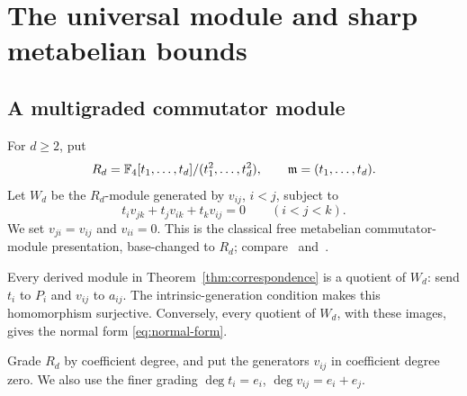 \section{The universal module and sharp metabelian bounds}
\label{sec:universal}

\subsection{A multigraded commutator module}

For \(d\ge2\), put
\[
 R_d=\mathbb F_4[t_1,\ldots,t_d]/(t_1^2,\ldots,t_d^2),
 \qquad\mathfrak m=(t_1,\ldots,t_d).
\]
Let \(W_d\) be the \(R_d\)-module generated by \(v_{ij}\), \(i<j\),
subject to
\begin{equation}\label{eq:module-triangle}
 t_iv_{jk}+t_jv_{ik}+t_kv_{ij}=0\qquad(i<j<k).
\end{equation}
We set \(v_{ji}=v_{ij}\) and \(v_{ii}=0\).
This is the classical free metabelian commutator-module presentation,
base-changed to \(R_d\); compare~\cite[Theorem~6.2]{PapadimaSuciu2004}
and~\cite[Sections~2--3]{KovacsStohr2013}.

Every derived module in Theorem~\ref{thm:correspondence} is a quotient of
\(W_d\): send \(t_i\) to \(P_i\) and \(v_{ij}\) to \(a_{ij}\).
The intrinsic-generation condition makes this homomorphism surjective.
Conversely, every quotient of \(W_d\), with these images, gives the
normal form \eqref{eq:normal-form}.

Grade \(R_d\) by coefficient degree, and put the generators \(v_{ij}\)
in coefficient degree zero. We also use the finer grading
\(\deg t_i=e_i\), \(\deg v_{ij}=e_i+e_j\).


